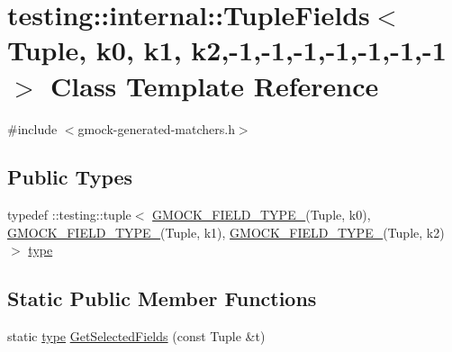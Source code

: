 \hypertarget{classtesting_1_1internal_1_1_tuple_fields_3_01_tuple_00_01k0_00_01k1_00_01k2_00-1_00-1_00-1_00-1_00-1_00-1_00-1_01_4}{}\section{testing\+:\+:internal\+:\+:Tuple\+Fields$<$ Tuple, k0, k1, k2,-\/1,-\/1,-\/1,-\/1,-\/1,-\/1,-\/1 $>$ Class Template Reference}
\label{classtesting_1_1internal_1_1_tuple_fields_3_01_tuple_00_01k0_00_01k1_00_01k2_00-1_00-1_00-1_00-1_00-1_00-1_00-1_01_4}


{\ttfamily \#include $<$gmock-\/generated-\/matchers.\+h$>$}

\subsection*{Public Types}
\begin{DoxyCompactItemize}
\item 
typedef \+::testing\+::tuple$<$ \hyperlink{gmock-generated-matchers_8h_acf3e27de83a73f0d873da1cd471e505b}{G\+M\+O\+C\+K\+\_\+\+F\+I\+E\+L\+D\+\_\+\+T\+Y\+P\+E\+\_\+}(Tuple, k0), \hyperlink{gmock-generated-matchers_8h_acf3e27de83a73f0d873da1cd471e505b}{G\+M\+O\+C\+K\+\_\+\+F\+I\+E\+L\+D\+\_\+\+T\+Y\+P\+E\+\_\+}(Tuple, k1), \hyperlink{gmock-generated-matchers_8h_acf3e27de83a73f0d873da1cd471e505b}{G\+M\+O\+C\+K\+\_\+\+F\+I\+E\+L\+D\+\_\+\+T\+Y\+P\+E\+\_\+}(Tuple, k2)$>$ \hyperlink{classtesting_1_1internal_1_1_tuple_fields_3_01_tuple_00_01k0_00_01k1_00_01k2_00-1_00-1_00-1_00-1_00-1_00-1_00-1_01_4_a2c7151e3fa5ea105e18ab8a93c7d700e}{type}
\end{DoxyCompactItemize}
\subsection*{Static Public Member Functions}
\begin{DoxyCompactItemize}
\item 
static \hyperlink{classtesting_1_1internal_1_1_tuple_fields_3_01_tuple_00_01k0_00_01k1_00_01k2_00-1_00-1_00-1_00-1_00-1_00-1_00-1_01_4_a2c7151e3fa5ea105e18ab8a93c7d700e}{type} \hyperlink{classtesting_1_1internal_1_1_tuple_fields_3_01_tuple_00_01k0_00_01k1_00_01k2_00-1_00-1_00-1_00-1_00-1_00-1_00-1_01_4_a331e96854627730e698fbeb4a31f1caa}{Get\+Selected\+Fields} (const Tuple \&t)
\end{DoxyCompactItemize}


